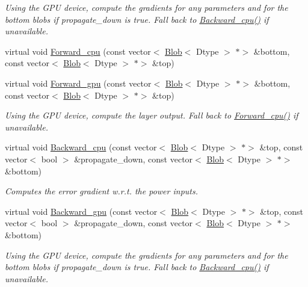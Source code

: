 \begin{DoxyCompactItemize}
\begin{DoxyCompactList}\small\item\em Using the G\+PU device, compute the gradients for any parameters and for the bottom blobs if propagate\+\_\+down is true. Fall back to \mbox{\hyperlink{classcaffe_1_1_power_layer_a98e5481671ca13339f888cad61b3d515}{Backward\+\_\+cpu()}} if unavailable. \end{DoxyCompactList}\item 
virtual void \mbox{\hyperlink{classcaffe_1_1_power_layer_abf30de2198baa2aa76ee85924feffa19}{Forward\+\_\+cpu}} (const vector$<$ \mbox{\hyperlink{classcaffe_1_1_blob}{Blob}}$<$ Dtype $>$ $\ast$$>$ \&bottom, const vector$<$ \mbox{\hyperlink{classcaffe_1_1_blob}{Blob}}$<$ Dtype $>$ $\ast$$>$ \&top)
\item 
\mbox{\label{classcaffe_1_1_power_layer_a0b68dfd6ade0964fcfa58c0997c59db0}} 
virtual void \mbox{\hyperlink{classcaffe_1_1_power_layer_a0b68dfd6ade0964fcfa58c0997c59db0}{Forward\+\_\+gpu}} (const vector$<$ \mbox{\hyperlink{classcaffe_1_1_blob}{Blob}}$<$ Dtype $>$ $\ast$$>$ \&bottom, const vector$<$ \mbox{\hyperlink{classcaffe_1_1_blob}{Blob}}$<$ Dtype $>$ $\ast$$>$ \&top)
\begin{DoxyCompactList}\small\item\em Using the G\+PU device, compute the layer output. Fall back to \mbox{\hyperlink{classcaffe_1_1_power_layer_a3f0196eab7b1f374a4705426d42b0711}{Forward\+\_\+cpu()}} if unavailable. \end{DoxyCompactList}\item 
virtual void \mbox{\hyperlink{classcaffe_1_1_power_layer_aa4c46da44e3e26f15c579351b7f54c5e}{Backward\+\_\+cpu}} (const vector$<$ \mbox{\hyperlink{classcaffe_1_1_blob}{Blob}}$<$ Dtype $>$ $\ast$$>$ \&top, const vector$<$ bool $>$ \&propagate\+\_\+down, const vector$<$ \mbox{\hyperlink{classcaffe_1_1_blob}{Blob}}$<$ Dtype $>$ $\ast$$>$ \&bottom)
\begin{DoxyCompactList}\small\item\em Computes the error gradient w.\+r.\+t. the power inputs. \end{DoxyCompactList}\item 
\mbox{\label{classcaffe_1_1_power_layer_a72c15e7b1a1907746bf74db86435d181}} 
virtual void \mbox{\hyperlink{classcaffe_1_1_power_layer_a72c15e7b1a1907746bf74db86435d181}{Backward\+\_\+gpu}} (const vector$<$ \mbox{\hyperlink{classcaffe_1_1_blob}{Blob}}$<$ Dtype $>$ $\ast$$>$ \&top, const vector$<$ bool $>$ \&propagate\+\_\+down, const vector$<$ \mbox{\hyperlink{classcaffe_1_1_blob}{Blob}}$<$ Dtype $>$ $\ast$$>$ \&bottom)
\begin{DoxyCompactList}\small\item\em Using the G\+PU device, compute the gradients for any parameters and for the bottom blobs if propagate\+\_\+down is true. Fall back to \mbox{\hyperlink{classcaffe_1_1_power_layer_a98e5481671ca13339f888cad61b3d515}{Backward\+\_\+cpu()}} if unavailable. \end{DoxyCompactList}\end{DoxyCompactItemize}
